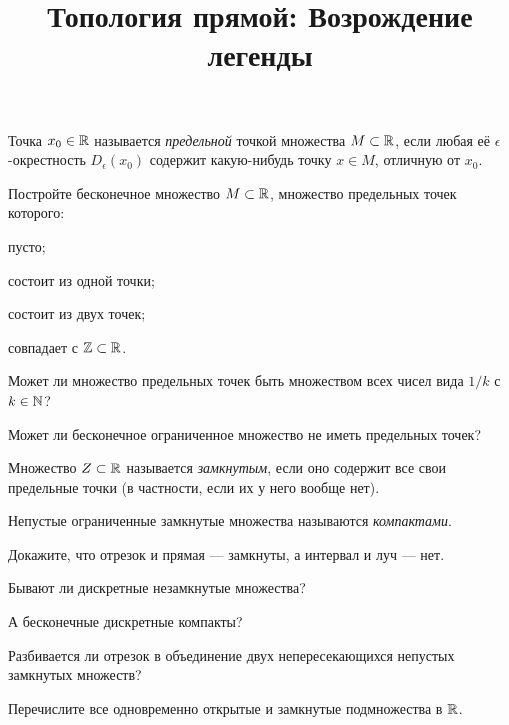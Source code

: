 \documentclass[a4paper, 12pt, num=29]{listok}
\begin{document}
\title{Топология прямой: Возрождение легенды}
\maketitle{}
\begin{definition}
	Точка $x_0 \in \mathbb{R}$ называется \textit{предельной} точкой множества $M \subset \mathbb{R}$,
	если любая её $\epsilon$-окрестность $D_{\epsilon}(x_0)$ содержит какую-нибудь точку $x \in M$, отличную от $x_0$.
\end{definition}
\begin{problem}
	Постройте бесконечное множество $M \subset \mathbb{R}$, множество предельных точек которого:
	\begin{probparts}
		\item пусто;
		\item состоит из одной точки;
		\item состоит из двух точек;
		\item совпадает с $\mathbb{Z} \subset \mathbb{R}$.
	\end{probparts}
\end{problem}
\begin{problem}
	Может ли множество предельных точек быть множеством всех чисел вида $1/k$ с $k\in\mathbb{N}$?
\end{problem}
\begin{problem}
	Может ли бесконечное ограниченное множество не иметь предельных точек?
\end{problem}
\begin{definition}
	Множество $Z \subset \mathbb{R}$ называется \textit{замкнутым}, если оно содержит все свои предельные точки (в частности, если их у него вообще нет).
\end{definition}
\begin{definition}
	Непустые ограниченные замкнутые множества называются \textit{компактами}.
\end{definition}
\begin{problem}
	Докажите, что отрезок и прямая --- замкнуты, а интервал и луч --- нет.
\end{problem}
\begin{problem}
\begin{probparts}
	\item Бывают ли дискретные незамкнутые множества?
	\item А бесконечные дискретные компакты?
\end{probparts}
\end{problem}
\begin{problem}
\begin{probparts}
	\item Разбивается ли отрезок в объединение двух непересекающихся непустых замкнутых множеств?
	\item Перечислите все одновременно открытые и замкнутые подмножества в $\mathbb{R}$.
\end{probparts}
\end{problem}
\end{document}
